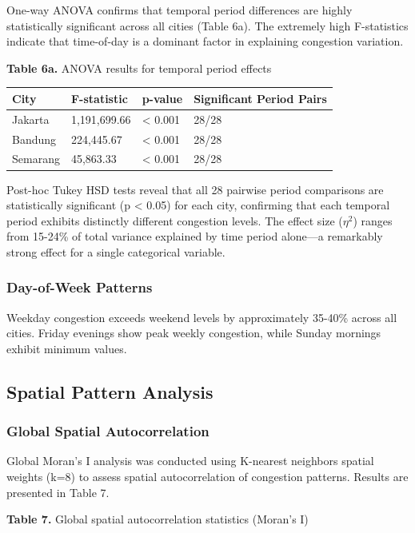 \documentclass[12pt,a4paper]{article}
\begin{document}
One-way ANOVA confirms that temporal period differences are highly statistically significant across all cities (Table 6a). The extremely high F-statistics indicate that time-of-day is a dominant factor in explaining congestion variation.

\textbf{Table 6a.} ANOVA results for temporal period effects

\begin{longtable}[]{@{}llll@{}}
\toprule\noalign{}
City & F-statistic & p-value & Significant Period Pairs \\
\midrule\noalign{}
\endhead
\bottomrule\noalign{}
\endlastfoot
Jakarta & 1,191,699.66 & < 0.001 & 28/28 \\
Bandung & 224,445.67 & < 0.001 & 28/28 \\
Semarang & 45,863.33 & < 0.001 & 28/28 \\
\end{longtable}

Post-hoc Tukey HSD tests reveal that all 28 pairwise period comparisons are statistically significant (p < 0.05) for each city, confirming that each temporal period exhibits distinctly different congestion levels. The effect size ($\eta^2$) ranges from 15-24\% of total variance explained by time period alone---a remarkably strong effect for a single categorical variable.

\subsubsection{Day-of-Week Patterns}

Weekday congestion exceeds weekend levels by approximately 35-40\% across all cities. Friday evenings show peak weekly congestion, while Sunday mornings exhibit minimum values.

\subsection{Spatial Pattern Analysis}

\subsubsection{Global Spatial Autocorrelation}

Global Moran's I analysis was conducted using K-nearest neighbors spatial weights (k=8) to assess spatial autocorrelation of congestion patterns. Results are presented in Table 7.

\textbf{Table 7.} Global spatial autocorrelation statistics (Moran's I)
\end{document}
